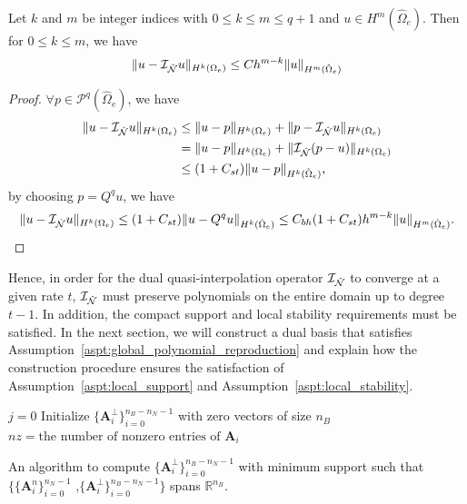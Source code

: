 \begin{theorem}
	Let $k$ and $m$ be integer indices with $0\leq{k}\leq{m}\leq{q+1}$ and $u\in{}H^m(\hat{\Omega}_e)$. Then for $0\leq{}k\leq{}m$, we have
	\begin{equation}
		\|{u-\mathcal{I}_{\hat{\mathcal{N}}}u}\|_{H^k(\Omega_e)}\leq{}C_{}h^{m-k}\|{u}\|_{H^m(\hat{\Omega}_e)}
	\end{equation}
	\begin{proof}
		$\forall{}p\in\mathcal{P}^q(\hat{\Omega}_e)$, we have
		\begin{align}
			\begin{split}
				\|{u-\mathcal{I}_{\hat{\mathcal{N}}}u}\|_{H^k(\Omega_e)}&\leq{}\|{u-p}\|_{H^k(\Omega_e)}+\|{p-\mathcal{I}_{\hat{\mathcal{N}}}u}\|_{H^k(\Omega_e)}\\
				&=\|{u-p}\|_{H^k(\Omega_e)}+\|{\mathcal{I}_{\hat{\mathcal{N}}}(p-u)}\|_{H^k(\Omega_e)}\\
				&\leq{}(1+C_{st})\|{u-p}\|_{H^k(\hat{\Omega}_e)},
			\end{split}
		\end{align}
		by choosing $p=Q^qu$, we have
		\begin{equation}
		  \|{u-\mathcal{I}_{\hat{\mathcal{N}}}u}\|_{H^k(\Omega_e)}\leq{}(1+C_{st})\|{u-Q^qu}\|_{H^k(\hat{\Omega}_e)}\leq{}C_{bh}(1+C_{st})h^{m-k}\|{u}\|_{H^m(\hat{\Omega}_e)}.
		\end{equation}
	\end{proof}
\end{theorem}
Hence, in order for the dual quasi-interpolation operator $\mathcal{I}_{\hat{\mathcal{N}}}$ to converge at a given rate $t$, $\mathcal{I}_{\hat{\mathcal{N}}}$ must preserve polynomials on the entire domain up to degree $t-1$. In addition, the compact support and local stability requirements must be satisfied. In the next section, we will construct a dual basis that satisfies Assumption~\ref{aspt:global_polynomial_reproduction} and explain how the construction procedure ensures the satisfaction of Assumption~\ref{aspt:local_support} and Assumption~\ref{aspt:local_stability}.

\begin{algorithm}

	\BlankLine
	$j=0$\;
	Initialize $\{\mathbf{A}^\perp_i\}_{i=0}^{n_B-n_N-1}$ with zero vectors of size $n_B$\;
	{
		$nz=\text{the number of nonzero entries of }\mathbf{A}_i$\;
		{
		}
	}
	\caption{An algorithm to compute $\{\mathbf{A}^\perp_i\}_{i=0}^{n_B-n_N-1}$ with minimum support such that $\{\{\mathbf{A}^n_i\}_{i=0}^{n_N-1}$  ,$\{\mathbf{A}^\perp_i\}_{i=0}^{n_B-n_N-1}\}$ spans $\mathbb{R}^{n_B}$.}\label{alg:kernel_basis}
\end{algorithm}

